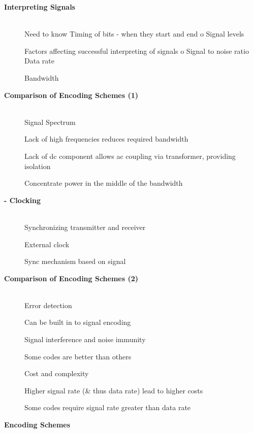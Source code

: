 \begin{description}
\os{\newpage}\item[{\rot\bf  Interpreting Signals }]~\\[-3ex]

\bi
  \ite Need to know
\ei
\bi
 \ite Timing of bits - when they start and end o Signal levels
 \ei


\bi
  \ite Factors affecting successful interpreting of signals o Signal to noise ratio
\ei
\bi
 \ite Data rate
 \ei

\bi
 \ite Bandwidth
 \ei



\os{\newpage}\item[{\rot\bf  Comparison of Encoding Schemes (1) }]~\\[-3ex]

\bi
  \ite Signal Spectrum

  \ite Lack of high frequencies reduces required bandwidth

  \ite Lack of dc component allows ac coupling via transformer, providing isolation

\ei
\bi
 \ite Concentrate power in the middle of the bandwidth
 \ei



\os{\newpage}\item[{\rot\bf  - Clocking }]~\\[-3ex]
\bi
 \ite Synchronizing transmitter and receiver
 \ei

\bi
 \ite External clock
 \ei

\bi
 \ite Sync mechanism based on signal
 \ei



\os{\newpage}\item[{\rot\bf  Comparison of Encoding Schemes (2) }]~\\[-3ex]

\bi
  \ite Error detection

  \ite Can be built in to signal encoding

  \ite Signal interference and noise immunity

\ei
\bi
 \ite Some codes are better than others
 \ei


\bi
  \ite Cost and complexity

  \ite Higher signal rate (\& thus data rate) lead to higher costs

\ei
\bi
 \ite Some codes require signal rate greater than data rate
 \ei



\os{\newpage}\item[{\rot\bf  Encoding Schemes }]~\\[-3ex]


\end{description}
